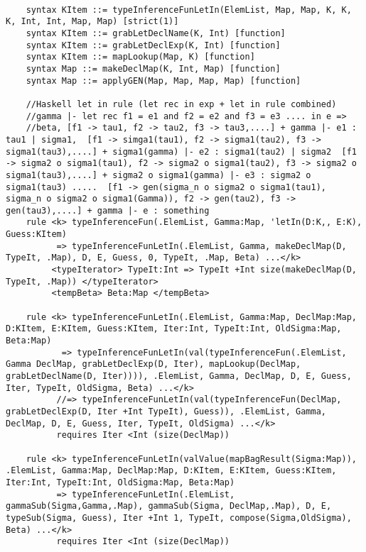 \begin{lstlisting}

    syntax KItem ::= typeInferenceFunLetIn(ElemList, Map, Map, K, K, K, Int, Int, Map, Map) [strict(1)]
    syntax KItem ::= grabLetDeclName(K, Int) [function]
    syntax KItem ::= grabLetDeclExp(K, Int) [function]
    syntax KItem ::= mapLookup(Map, K) [function]
    syntax Map ::= makeDeclMap(K, Int, Map) [function]
    syntax Map ::= applyGEN(Map, Map, Map, Map) [function]

    //Haskell let in rule (let rec in exp + let in rule combined)
    //gamma |- let rec f1 = e1 and f2 = e2 and f3 = e3 .... in e =>
    //beta, [f1 -> tau1, f2 -> tau2, f3 -> tau3,....] + gamma |- e1 : tau1 | sigma1,  [f1 -> simga1(tau1), f2 -> sigma1(tau2), f3 -> sigma1(tau3),....] + sigma1(gamma) |- e2 : sigma1(tau2) | sigma2  [f1 -> sigma2 o sigma1(tau1), f2 -> sigma2 o sigma1(tau2), f3 -> sigma2 o sigma1(tau3),....] + sigma2 o sigma1(gamma) |- e3 : sigma2 o sigma1(tau3) .....  [f1 -> gen(sigma_n o sigma2 o sigma1(tau1), sigma_n o sigma2 o sigma1(Gamma)), f2 -> gen(tau2), f3 -> gen(tau3),....] + gamma |- e : something
    rule <k> typeInferenceFun(.ElemList, Gamma:Map, 'letIn(D:K,, E:K), Guess:KItem)
          => typeInferenceFunLetIn(.ElemList, Gamma, makeDeclMap(D, TypeIt, .Map), D, E, Guess, 0, TypeIt, .Map, Beta) ...</k>
         <typeIterator> TypeIt:Int => TypeIt +Int size(makeDeclMap(D, TypeIt, .Map)) </typeIterator>
         <tempBeta> Beta:Map </tempBeta>

    rule <k> typeInferenceFunLetIn(.ElemList, Gamma:Map, DeclMap:Map, D:KItem, E:KItem, Guess:KItem, Iter:Int, TypeIt:Int, OldSigma:Map, Beta:Map)
           => typeInferenceFunLetIn(val(typeInferenceFun(.ElemList, Gamma DeclMap, grabLetDeclExp(D, Iter), mapLookup(DeclMap, grabLetDeclName(D, Iter)))), .ElemList, Gamma, DeclMap, D, E, Guess, Iter, TypeIt, OldSigma, Beta) ...</k>
          //=> typeInferenceFunLetIn(val(typeInferenceFun(DeclMap, grabLetDeclExp(D, Iter +Int TypeIt), Guess)), .ElemList, Gamma, DeclMap, D, E, Guess, Iter, TypeIt, OldSigma) ...</k>
          requires Iter <Int (size(DeclMap))

    rule <k> typeInferenceFunLetIn(valValue(mapBagResult(Sigma:Map)), .ElemList, Gamma:Map, DeclMap:Map, D:KItem, E:KItem, Guess:KItem, Iter:Int, TypeIt:Int, OldSigma:Map, Beta:Map)
          => typeInferenceFunLetIn(.ElemList, gammaSub(Sigma,Gamma,.Map), gammaSub(Sigma, DeclMap,.Map), D, E, typeSub(Sigma, Guess), Iter +Int 1, TypeIt, compose(Sigma,OldSigma), Beta) ...</k>
          requires Iter <Int (size(DeclMap))


\end{lstlisting}
